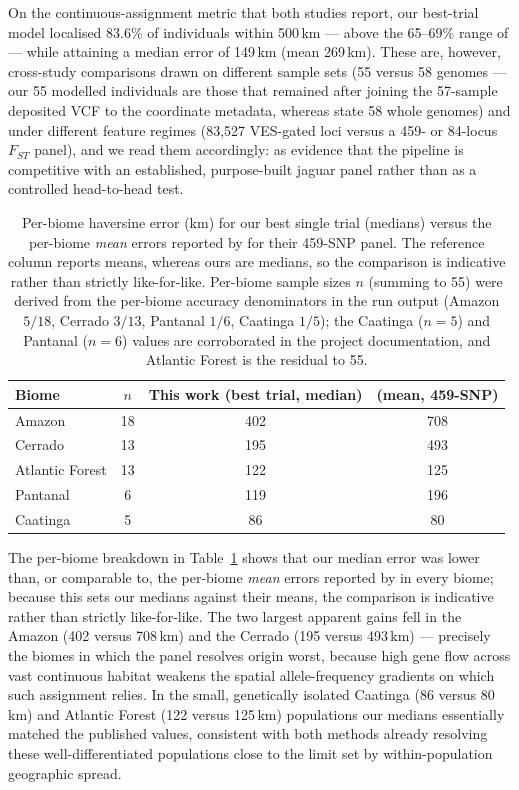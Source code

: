 \documentclass[twocolumn,10pt]{article}
\begin{document}
On the continuous-assignment metric that both studies report, our best-trial model localised 83.6\%
of individuals within 500\,km --- above the 65--69\% range of \citet{lazzari2025development} ---
while attaining a median error of 149\,km (mean 269\,km). These are, however, cross-study
comparisons drawn on different sample sets (55 versus 58 genomes --- our 55 modelled individuals are
those that remained after joining the 57-sample deposited VCF to the coordinate metadata, whereas
\citet{lazzari2025development} state 58 whole genomes) and under different feature regimes (83{,}527
VES-gated loci versus a 459- or 84-locus $F_{ST}$ panel), and we read them accordingly: as evidence
that the pipeline is competitive with an established, purpose-built jaguar panel rather than as a
controlled head-to-head test.

\begin{table}[t]
\centering
\caption{Per-biome haversine error (km) for our best single trial (medians) versus the per-biome
\emph{mean} errors reported by \citet{lazzari2025development} for their 459-SNP panel. The reference
column reports means, whereas ours are medians, so the comparison is indicative rather than strictly
like-for-like. Per-biome sample sizes $n$ (summing to 55) were derived from the per-biome accuracy
denominators in the run output (Amazon $5/18$, Cerrado $3/13$, Pantanal $1/6$, Caatinga $1/5$); the
Caatinga ($n=5$) and Pantanal ($n=6$) values are corroborated in the project documentation, and
Atlantic Forest is the residual to 55.}
\label{tab:lazzari-perbiome}
\begin{tabular}{lccc}
\toprule
Biome & $n$ & This work (best trial, median) & \citet{lazzari2025development} (mean, 459-SNP) \\
\midrule
Amazon          & 18 & 402 & 708 \\
Cerrado         & 13 & 195 & 493 \\
Atlantic Forest & 13 & 122 & 125 \\
Pantanal        & 6  & 119 & 196 \\
Caatinga        & 5  & 86  & 80  \\
\bottomrule
\end{tabular}
\end{table}

The per-biome breakdown in Table~\ref{tab:lazzari-perbiome} shows that our median error was lower
than, or comparable to, the per-biome \emph{mean} errors reported by \citet{lazzari2025development}
in every biome; because this sets our medians against their means, the comparison is indicative
rather than strictly like-for-like. The two largest apparent gains fell in the Amazon (402 versus
708\,km) and the Cerrado (195 versus 493\,km) --- precisely the biomes in which the panel resolves
origin worst, because high gene flow across vast continuous habitat weakens the spatial
allele-frequency gradients on which such assignment relies. In the small, genetically isolated
Caatinga (86 versus 80\,km) and Atlantic Forest (122 versus 125\,km) populations our medians
essentially matched the published values, consistent with both methods already resolving these
well-differentiated populations close to the limit set by within-population geographic spread.
\end{document}
